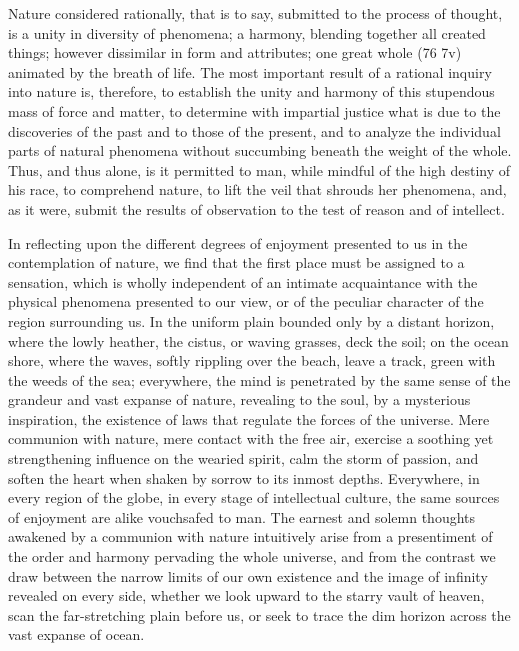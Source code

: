 Nature considered rationally, that is to say, submitted to the process of thought, is a unity in diversity of phenomena; a harmony, blending together all created things; however dissimilar in form and attributes; one great whole (76 7v) animated by the breath of life. The most important result of a rational inquiry into nature is, therefore, to establish the unity and harmony of this stupendous mass of force and matter, to determine with impartial justice what is due to the discoveries of the past and to those of the present, and to analyze the individual parts of natural phenomena without succumbing beneath the weight of the whole. Thus, and thus alone, is it permitted to man, while mindful of the high destiny of his race, to comprehend nature, to lift the veil that shrouds her phenomena, and, as it were, submit the results of observation to the test of reason and of intellect.

In reflecting upon the different degrees of enjoyment presented to us in the contemplation of nature, we find that the first place must be assigned to a sensation, which is wholly independent of an intimate acquaintance with the physical phenomena presented to our view, or of the peculiar character of the region surrounding us. In the uniform plain bounded only by a distant horizon, where the lowly heather, the cistus, or waving grasses, deck the soil; on the ocean shore, where the waves, softly rippling over the beach, leave a track, green with the weeds of the sea; everywhere, the mind is penetrated by the same sense of the grandeur and vast expanse of nature, revealing to the soul, by a mysterious inspiration, the existence of laws that regulate the forces of the universe. Mere communion with nature, mere contact with the free air, exercise a soothing yet strengthening influence on the wearied spirit, calm the storm of passion, and soften the heart when shaken by sorrow to its inmost depths. Everywhere, in every region of the globe, in every stage of intellectual culture, the same sources of enjoyment are alike vouchsafed to man. The earnest and solemn thoughts awakened by a communion with nature intuitively arise from a presentiment of the order and harmony pervading the whole universe, and from the contrast we draw between the narrow limits of our own existence and the image of infinity revealed on every side, whether we look upward to the starry vault of heaven, scan the far-stretching plain before us, or seek to trace the dim horizon across the vast expanse of ocean.

